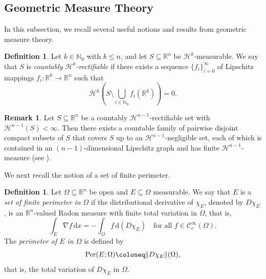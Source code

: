 \documentclass[pdflatex,sn-mathphys-num]{sn-jnl}
\theoremstyle{plain}
\theoremstyle{definition}
\newtheorem{definition}[theorem]{Definition}
\newtheorem{rem}[theorem]{Remark}
\DeclareMathOperator{\Per}{\textup{Per}}
\begin{document}
\subsection{Geometric Measure Theory}

In this subsection, we recall several useful notions and results from geometric measure theory. 

\begin{definition}\label{rectif}
Let $k \in \mathbb{N}_0$ with $k \leq n$, and let $S \subseteq \mathbb{R}^n$ be $\mathcal{H}^k$-measurable.  
We say that $S$ is \textit{countably $\mathcal{H}^{k}$-rectifiable} if there exists a sequence $\{f_i\}_{i=0}^{\infty}$ of Lipschitz mappings $f_i \colon \mathbb{R}^k \to \mathbb{R}^n$ such that 
\[
\mathcal{H}^k\!\left(S \setminus \bigcup_{i \in \mathbb{N}_0} f_i(\mathbb{R}^k)\right) = 0.
\]
\end{definition}

\begin{rem}\label{R1}
Let $S \subseteq \mathbb{R}^n$ be a countably $\mathcal{H}^{n-1}$-rectifiable set with $\mathcal{H}^{n-1}(S) < \infty$.  
Then there exists a countable family of pairwise disjoint compact subsets of $S$ that covers $S$ up to an $\mathcal{H}^{n-1}$-negligible set, each of which is contained in an $(n-1)$-dimensional Lipschitz graph and has finite $\mathcal{H}^{n-1}$-measure (see \cite[Lemma 11.1 and Remark 11.7]{simon}). 
\end{rem}

We next recall the notion of a set of finite perimeter.

\begin{definition}
Let $\Omega \subseteq \mathbb{R}^n$ be open and $E \subseteq \Omega$ measurable.  
We say that $E$ is a \textit{set of finite perimeter in $\Omega$} if the distributional derivative of $\chi_E$, denoted by $D\chi_E$, is an $\mathbb{R}^n$-valued Radon measure with finite total variation in $\Omega$, that is,
\[
\int_E \nabla f \, \mathrm{d}x = - \int_\Omega f \, \mathrm{d}(D\chi_E)
\quad \text{for all } f \in \mathcal{C}_c^\infty(\Omega).
\]
The \textit{perimeter of $E$ in $\Omega$} is defined by
\[
\Per(E; \Omega) \coloneq \|D\chi_E\|(\Omega),
\]
that is, the total variation of $D\chi_E$ in $\Omega$.
\end{definition}
\end{document}

